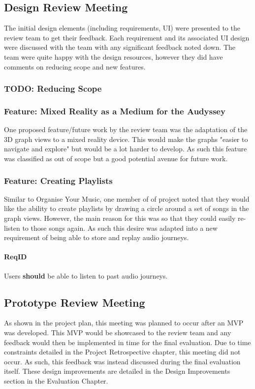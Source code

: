 \subsection{Design Review Meeting}
The initial design elements (including requirements, UI) were presented to the review team to get their feedback. Each requirement and its associated UI design were discussed with the team with any significant feedback noted down. The team were quite happy with the design resources, however they did have comments on reducing scope and new features.

\subsubsection{TODO: Reducing Scope}%

\subsubsection{Feature: Mixed Reality as a Medium for the Audyssey}
One proposed feature/future work by the review team was the adaptation of the 3D graph views to a mixed reality device. This would make the graphs "easier to navigate and explore" but would be a lot harder to develop. As such this feature was classified as out of scope but a good potential avenue for future work.

\subsubsection{Feature: Creating Playlists}
Similar to Organise Your Music, one member of of project noted that they would like the ability to create playlists by drawing a circle around a set of songs in the graph views. However, the main reason for this was so that they could easily re-listen to those songs again. As such this desire was adapted into a new requirement of being able to store and replay audio journeys.%
\paragraph{ReqID} Users \textbf{should} be able to listen to past audio journeys. %

\subsection{Prototype Review Meeting}
As shown in the project plan, this meeting was planned to occur after an MVP was developed. This MVP would be showcased to the review team and any feedback would then be implemented in time for the final evaluation. Due to time constraints detailed in the Project Retrospective chapter, this meeting did not occur. As such, this feedback was instead discussed during the final evaluation itself. These design improvements are detailed in the Design Improvements section in the Evaluation Chapter.

